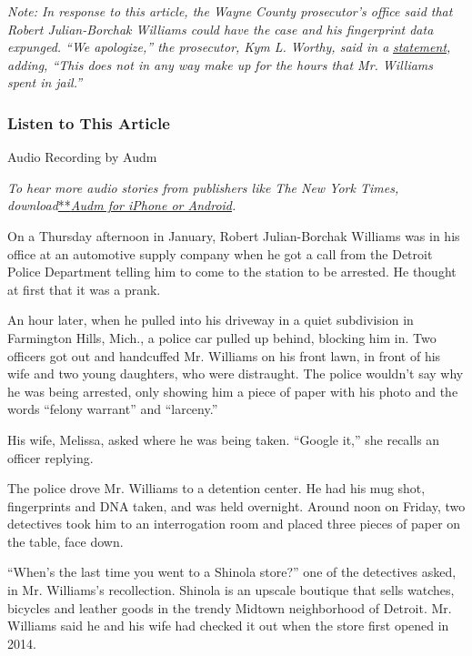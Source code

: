 \emph{Note: In response to this article, the Wayne County prosecutor's
office said that Robert Julian-Borchak Williams could have the case and
his fingerprint data expunged. ``We apologize,'' the prosecutor, Kym L.
Worthy, said in a}
\href{https://int.graylady3jvrrxbe.onion/data/documenthelper/7046-facial-recognition-arrest/5a6d6d0047295fad363b/optimized/full.pdf\#page=1}{\emph{statement}}\emph{,
adding, ``This does not in any way make up for the hours that Mr.
Williams spent in jail.''}

\hypertarget{listen-to-this-article}{%
\subsubsection{Listen to This Article}\label{listen-to-this-article}}

Audio Recording by Audm

\emph{To hear more audio stories from publishers like The New York
Times,
download}\href{https://www.audm.com/?utm_source=nytmag\&utm_medium=embed\&utm_campaign=left_behind_draper}{**}\href{https://www.audm.com/?utm_source=nyt\&utm_medium=embed\&utm_campaign=wrongfully_accused_algorithm}{\emph{Audm
for iPhone or Android}}\emph{.}

On a Thursday afternoon in January, Robert Julian-Borchak Williams was
in his office at an automotive supply company when he got a call from
the Detroit Police Department telling him to come to the station to be
arrested. He thought at first that it was a prank.

An hour later, when he pulled into his driveway in a quiet subdivision
in Farmington Hills, Mich., a police car pulled up behind, blocking him
in. Two officers got out and handcuffed Mr. Williams on his front lawn,
in front of his wife and two young daughters, who were distraught. The
police wouldn't say why he was being arrested, only showing him a piece
of paper with his photo and the words ``felony warrant'' and
``larceny.''

His wife, Melissa, asked where he was being taken. ``Google it,'' she
recalls an officer replying.

The police drove Mr. Williams to a detention center. He had his mug
shot, fingerprints and DNA taken, and was held overnight. Around noon on
Friday, two detectives took him to an interrogation room and placed
three pieces of paper on the table, face down.

``When's the last time you went to a Shinola store?'' one of the
detectives asked, in Mr. Williams's recollection. Shinola is an upscale
boutique that sells watches, bicycles and leather goods in the trendy
Midtown neighborhood of Detroit. Mr. Williams said he and his wife had
checked it out when the store first opened in 2014.

